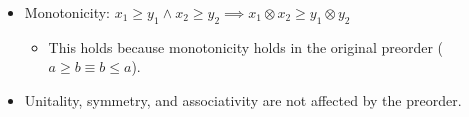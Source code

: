 \begin{itemize}
    \item   Monotonicity: $x_1 \geq y_1 \land x_2 \geq y_2 \implies x_1 \otimes x_2 \geq y_1 \otimes y_2$
          \begin{itemize}
            \item This holds because monotonicity holds in the original preorder ($a\geq b \equiv b \leq a$).
          \end{itemize}
    \item Unitality, symmetry, and associativity are not affected by the preorder.
  \end{itemize}
